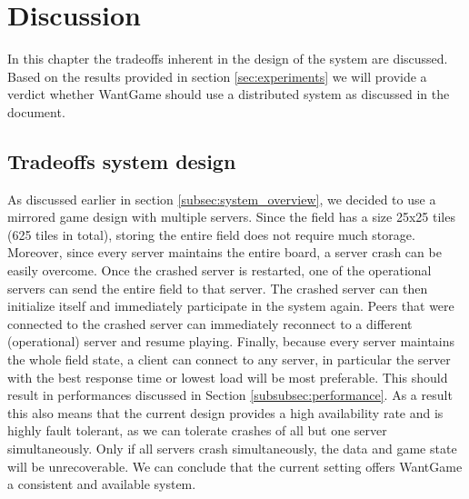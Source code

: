 \section{Discussion}


	In this chapter the tradeoffs inherent in the design of the system are discussed. Based on the results provided in section \ref{sec:experiments} we will provide a verdict whether WantGame should use a distributed system as discussed in the document.
	
	
	\subsection{Tradeoffs system design}
	\label{subsec:tradeoffs_system_design}
		As discussed earlier in section \ref{subsec:system_overview}, we decided to use a mirrored game design with multiple servers. 
		Since the field has a size 25x25 tiles (625 tiles in total), storing the entire field does not require much storage. 
		Moreover, since every server maintains the entire board, a server crash can be easily overcome.
		Once the crashed server is restarted, one of the operational servers can send the entire field to that server. 
		The crashed server can then initialize itself and immediately participate in the system again. 
		Peers that were connected to the crashed server can immediately reconnect to a different (operational) server and resume playing.
		Finally, because every server maintains the whole field state, a client can connect to any server, in particular the server with the best response time or lowest load will be most preferable.
		This should result in performances discussed in Section \ref{subsubsec:performance}.
		As a result this also means that the current design provides a high availability rate and is highly fault tolerant, as we can tolerate crashes of all but one server simultaneously. 
		Only if all servers crash simultaneously, the data and game state will be unrecoverable.
		We can conclude that the current setting offers WantGame a consistent and available system. 
		
